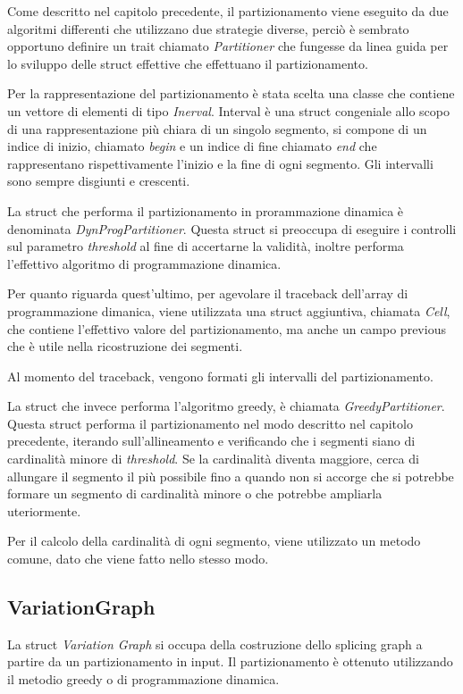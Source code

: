 Come descritto nel capitolo precedente, il partizionamento viene eseguito da due algoritmi differenti che utilizzano due strategie diverse, perciò è sembrato opportuno definire un trait chiamato \textit{Partitioner} che fungesse da linea guida per lo sviluppo delle struct effettive che effettuano il partizionamento.

Per la rappresentazione del partizionamento è stata scelta una classe che contiene un vettore di elementi di tipo \textit{Inerval}. Interval è una struct congeniale allo scopo di una rappresentazione più chiara di un singolo segmento, si compone di un indice di inizio, chiamato \textit{begin} e un indice di fine chiamato \textit{end} che rappresentano rispettivamente l'inizio e la fine di ogni segmento.
Gli intervalli sono sempre disgiunti e crescenti.

La struct che performa il partizionamento in prorammazione dinamica è denominata \textit{DynProgPartitioner}. Questa struct si preoccupa di eseguire i controlli sul parametro \textit{threshold} al fine di accertarne la validità, inoltre performa l'effettivo algoritmo di programmazione dinamica.

Per quanto riguarda quest'ultimo, per agevolare il traceback dell'array di programmazione dimanica, viene utilizzata una struct aggiuntiva, chiamata \textit{Cell}, che contiene l'effettivo valore del partizionamento, ma anche un campo previous che è utile nella ricostruzione dei segmenti.

Al momento del traceback, vengono formati gli intervalli del partizionamento.

La struct che invece performa l'algoritmo greedy, è chiamata \textit{GreedyPartitioner}. Questa struct performa il partizionamento nel modo descritto nel capitolo precedente, iterando sull'allineamento e verificando che i segmenti siano di cardinalità minore di \textit{threshold}. Se la cardinalità diventa maggiore, cerca di allungare il segmento il più possibile fino a quando non si accorge che si potrebbe formare un segmento di cardinalità minore o che potrebbe ampliarla uteriormente.

Per il calcolo della cardinalità di ogni segmento, viene utilizzato un metodo comune, dato che viene fatto nello stesso modo.

\newpage

\subsection{VariationGraph}
La struct \textit{Variation Graph} si occupa della costruzione dello splicing graph a partire da un partizionamento in input. Il partizionamento è ottenuto utilizzando il metodio greedy o di programmazione dinamica.

